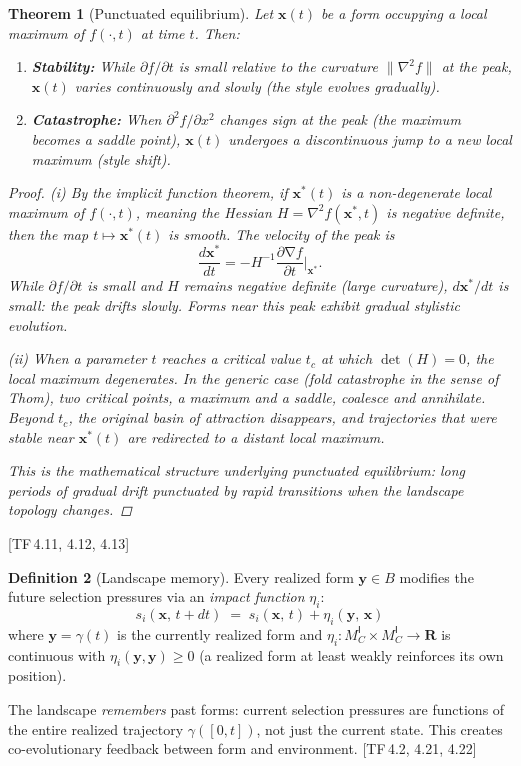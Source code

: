 \documentclass[10pt]{article}
\theoremstyle{definition}
\newtheorem{definition}{Definition}[section]
\theoremstyle{plain}
\newtheorem{theorem}[definition]{Theorem}
\theoremstyle{remark}
\newcommand{\MC}{M^{\mathsf{I}}_C}          %
\providecommand{\R}{}
\renewcommand{\R}{\mathbf{R}}               %
\newcommand{\norm}[1]{\lVert #1 \rVert}
\DeclareMathOperator{\grad}{\nabla}
\newcommand{\TF}[1]{\textnormal{[TF\,#1]}}  %
\begin{document}
\begin{theorem}[Punctuated equilibrium]\label{thm:4.2}
Let $\bm{x}(t)$ be a form occupying a local maximum of $f(\cdot, t)$
at time $t$. Then:
\begin{enumerate}[label=(\roman*),nosep]
  \item \textbf{Stability:} While $\partial f / \partial t$ is small
    relative to the curvature $\norm{\nabla^2 f}$ at the peak,
    $\bm{x}(t)$ varies continuously and slowly (the style evolves
    gradually).
  \item \textbf{Catastrophe:} When $\partial^2 f / \partial x^2$ changes
    sign at the peak (the maximum becomes a saddle point), $\bm{x}(t)$
    undergoes a discontinuous jump to a new local maximum (style shift).
\end{enumerate}

\begin{proof}
\textit{(i)}\; By the implicit function theorem, if $\bm{x}^*(t)$ is a
non-degenerate local maximum of $f(\cdot, t)$, meaning the Hessian
$H = \nabla^2 f(\bm{x}^*, t)$ is negative definite, then the map
$t \mapsto \bm{x}^*(t)$ is smooth. The velocity of the peak is
\[
  \frac{d\bm{x}^*}{dt} = -H^{-1} \frac{\partial \grad f}{\partial t}
  \bigg|_{\bm{x}^*}.
\]
While $\partial f / \partial t$ is small and $H$ remains negative
definite (large curvature), $d\bm{x}^*/dt$ is small: the peak drifts
slowly. Forms near this peak exhibit gradual stylistic evolution.

\textit{(ii)}\; When a parameter $t$ reaches a critical value $t_c$ at
which $\det(H) = 0$, the local maximum degenerates. In the generic case
(fold catastrophe in the sense of Thom), two critical points, a maximum
and a saddle, coalesce and annihilate. Beyond $t_c$, the original basin
of attraction disappears, and trajectories that were stable near
$\bm{x}^*(t)$ are redirected to a distant local maximum.

This is the mathematical structure underlying punctuated equilibrium:
long periods of gradual drift punctuated
by rapid transitions when the landscape topology changes. \qedhere
\end{proof}
\end{theorem}

\TF{4.11, 4.12, 4.13}

\begin{definition}[Landscape memory]\label{def:4.3}
Every realized form $\bm{y} \in B$ modifies the future selection
pressures via an \emph{impact function} $\eta_i$:
\[
  s_i(\bm{x},\, t + dt) \;=\;
  s_i(\bm{x},\, t) + \eta_i(\bm{y},\, \bm{x})
\]
where $\bm{y} = \gamma(t)$ is the currently realized form and
$\eta_i : \MC \times \MC \to \R$ is continuous with
$\eta_i(\bm{y}, \bm{y}) \geq 0$ (a realized form at least weakly
reinforces its own position).

The landscape \emph{remembers} past forms: current selection pressures
are functions of the entire realized trajectory $\gamma([0, t])$,
not just the current state. This creates co-evolutionary feedback
between form and environment. \TF{4.2, 4.21, 4.22}
\end{definition}
\end{document}
